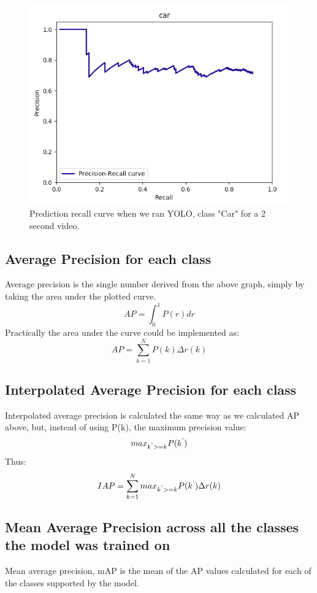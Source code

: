 \documentclass[conference]{IEEEtran}
\newcommand{\figwidthb}{0.80\linewidth}
\begin{document}
\begin{figure}
\centering
\includegraphics[width=\figwidthb]{fig/pr_yolo.png}
\caption{Prediction recall curve when we ran YOLO, class "Car" for a 2 second video.} \label{fig.structure}
\end{figure}

\subsection{Average Precision for each class}
	Average precision is the single number derived from the above graph, simply by taking the area under the plotted curve.
	$${AP} = \int_{0}^{1} P(r) dr$$
	Practically the area under the curve could be implemented as:
	$${AP} = \sum_{k=1}^{N} P(k) {\Delta}r(k)$$
\subsection{Interpolated Average Precision for each class}
	Interpolated average precision is calculated the same way as we calculated {AP} above, but, instead of using {P(k)}, the maximum precision value: 
	$${max}_{k\textsuperscript{'}>= k} {P(k\textsuperscript{'})}$$
	Thus:
	$${IAP} = \sum_{k=1}^{N} {max}_{k\textsuperscript{'}>= k} {P(k\textsuperscript{'})} {\Delta}r(k)$$

\subsection{Mean Average Precision across all the classes the model was trained on}
	Mean average precision, {mAP} is the mean of the {AP} values calculated for each of the classes supported by the model. 
	
\end{document}
